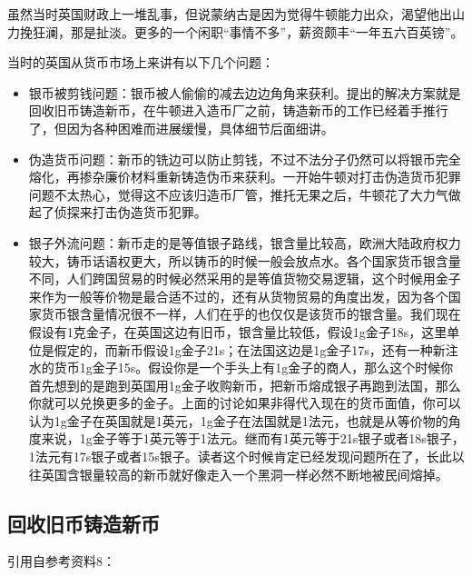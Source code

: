 \documentclass[12pt,oneside]{book}
\begin{document}
虽然当时英国财政上一堆乱事，但说蒙纳古是因为觉得牛顿能力出众，渴望他出山力挽狂澜，那是扯淡。更多的一个闲职“事情不多”，薪资颇丰“一年五六百英镑”。

当时的英国从货币市场上来讲有以下几个问题：

\begin{itemize}
\item 银币被剪钱问题：银币被人偷偷的减去边边角角来获利。提出的解决方案就是回收旧币铸造新币，在牛顿进入造币厂之前，铸造新币的工作已经着手推行了，但因为各种困难而进展缓慢，具体细节后面细讲。

\item 伪造货币问题：新币的铣边可以防止剪钱，不过不法分子仍然可以将银币完全熔化，再掺杂廉价材料重新铸造伪币来获利。一开始牛顿对打击伪造货币犯罪问题不太热心，觉得这不应该归造币厂管，推托无果之后，牛顿花了大力气做起了侦探来打击伪造货币犯罪。

\item 银子外流问题：新币走的是等值银子路线，银含量比较高，欧洲大陆政府权力较大，铸币话语权更大，所以铸币的时候一般会放点水。各个国家货币银含量不同，人们跨国贸易的时候必然采用的是等值货物交易逻辑，这个时候用金子来作为一般等价物是最合适不过的，还有从货物贸易的角度出发，因为各个国家货币银含量情况很不一样，人们在乎的也仅仅是该货币的银含量。我们现在假设有1克金子，在英国这边有旧币，银含量比较低，假设1g金子18s，这里单位是假定的，而新币假设1g金子21s；在法国这边是1g金子17s，还有一种新注水的货币1g金子15s。假设你是一个手头上有1g金子的商人，那么这个时候你首先想到的是跑到英国用1g金子收购新币，把新币熔成银子再跑到法国，那么你就可以兑换更多的金子。上面的讨论如果非得代入现在的货币面值，你可以认为1g金子在英国就是1英元，1g金子在法国就是1法元，也就是从等价物的角度来说，1g金子等于1英元等于1法元。继而有1英元等于21s银子或者18s银子，1法元有17s银子或者15s银子。读者这个时候肯定已经发现问题所在了，长此以往英国含银量较高的新币就好像走入一个黑洞一样必然不断地被民间熔掉。
\end{itemize}





\subsection{回收旧币铸造新币}
引用自参考资料8：
\end{document}
